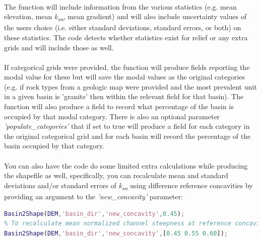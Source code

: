 \paragraph{}The function will include information from the various statistics (e.g. mean elevation, mean \textit{k\textsubscript{sn}}, mean gradient) and will also include uncertainty values of the users choice (i.e. either standard deviations, standard errors, or both) on these statistics. The code detects whether statistics exist for relief or any extra grids and will include those as well. 

\paragraph{}If categorical grids were provided, the function will produce fields reporting the modal value for these but will save the modal values as the original categories (e.g. if rock types from a geologic map were provided and the most prevalent unit in a given basin is 'granite' then within the relevant field for that basin). The function will also produce a field to record what percentage of the basin is occupied by that modal category. There is also an optional parameter \textit{'populate\_categories'} that if set to true will produce a field for each category in the original categorical grid and for each basin will record the percentage of the basin occupied by that category.

\paragraph{}You can also have the code do some limited extra calculations while producing the shapefile as well, specifically, you can recalculate mean and standard deviations and/or standard errors of \textit{k\textsubscript{sn}} using difference reference concavities by providing an argument to the \textit{'new\_concavity'} parameter:

\begin{lstlisting}[language=Matlab]
% To recaculate mean normalized channel steepness with a reference concavity of 0.45
Basin2Shape(DEM,'basin_dir','new_concavity',0.45);
% To recalculate mean normalized channel steepness at reference concavities of 0.45, 0.55, and 0.60
Basin2Shape(DEM,'basin_dir','new_concavity',[0.45 0.55 0.60]);
\end{lstlisting}

